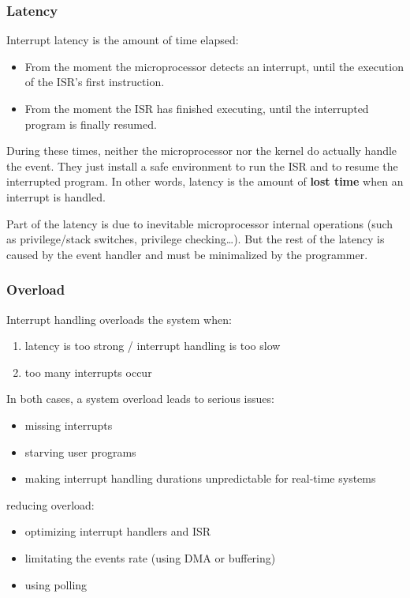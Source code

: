 %
%
%

\begin{frame}
  \frametitle{Latency}

  Interrupt latency is the amount of time elapsed:

  \begin{itemize}
  \item From the moment the microprocessor detects an interrupt, until the
    execution of the ISR's first instruction.
  \item From the moment the ISR has finished executing, until the interrupted
    program is finally resumed.
  \end{itemize}

  \-

  During these times, neither the microprocessor nor the kernel do actually
  handle the event. They just install a safe environment to run the ISR and to
  resume the interrupted program. In other words, latency is the amount of
  {\bf lost time} when an interrupt is handled.

  \-

  Part of the latency is due to inevitable microprocessor internal operations
  (such as privilege/stack switches, privilege checking\ldots). But the rest of
  the latency is caused by the event handler and must be minimalized by the
  programmer.

\end{frame}

%
%
%

\begin{frame}
  \frametitle{Overload}

  Interrupt handling overloads the system when:

  \begin{enumerate}
    \item latency is too strong / interrupt handling is too slow
    \item too many interrupts occur
  \end{enumerate}

  \-

  In both cases, a system overload leads to serious issues:

  \begin{itemize}
    \item missing interrupts
    \item starving user programs
    \item making interrupt handling durations unpredictable for real-time systems
  \end{itemize}

  \-

  reducing overload:
  \begin{itemize}
    \item optimizing interrupt handlers and ISR
    \item limitating the events rate (using DMA or buffering)
    \item using polling
  \end{itemize}

\end{frame}

